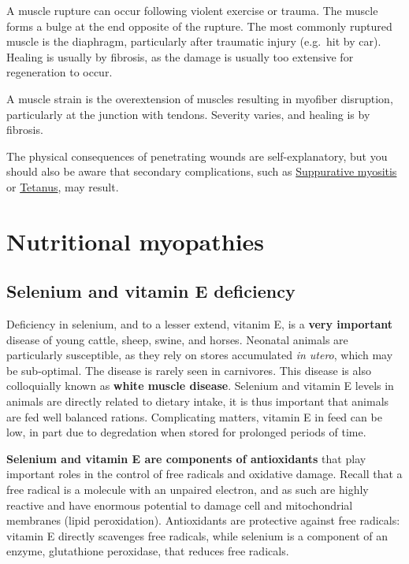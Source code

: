 \documentclass[openany]{book}
\begin{document}
A muscle rupture can occur following violent exercise or trauma. The
muscle forms a bulge at the end opposite of the rupture. The most
commonly ruptured muscle is the diaphragm, particularly after traumatic
injury (e.g.~hit by car). Healing is usually by fibrosis, as the damage
is usually too extensive for regeneration to occur.

A muscle strain is the overextension of muscles resulting in myofiber
disruption, particularly at the junction with tendons. Severity varies,
and healing is by fibrosis.

The physical consequences of penetrating wounds are self-explanatory,
but you should also be aware that secondary complications, such as
\protect\hyperlink{suppurative-myositis}{Suppurative myositis} or
\protect\hyperlink{tetanus}{Tetanus}, may result.

\chapter{Nutritional myopathies}\label{nutritional-myopathies}

\hypertarget{selenium-and-vitamin-e-deficiency}{\section{Selenium and
vitamin E deficiency}\label{selenium-and-vitamin-e-deficiency}}

Deficiency in selenium, and to a lesser extend, vitanim E, is a
\textbf{very important} disease of young cattle, sheep, swine, and
horses. Neonatal animals are particularly susceptible, as they rely on
stores accumulated \emph{in utero}, which may be sub-optimal. The
disease is rarely seen in carnivores. This disease is also colloquially
known as \textbf{white muscle disease}. Selenium and vitamin E levels in
animals are directly related to dietary intake, it is thus important
that animals are fed well balanced rations. Complicating matters,
vitamin E in feed can be low, in part due to degredation when stored for
prolonged periods of time.

\textbf{Selenium and vitamin E are components of antioxidants} that play
important roles in the control of free radicals and oxidative damage.
Recall that a free radical is a molecule with an unpaired electron, and
as such are highly reactive and have enormous potential to damage cell
and mitochondrial membranes (lipid peroxidation). Antioxidants are
protective against free radicals: vitamin E directly scavenges free
radicals, while selenium is a component of an enzyme, glutathione
peroxidase, that reduces free radicals.
\end{document}
